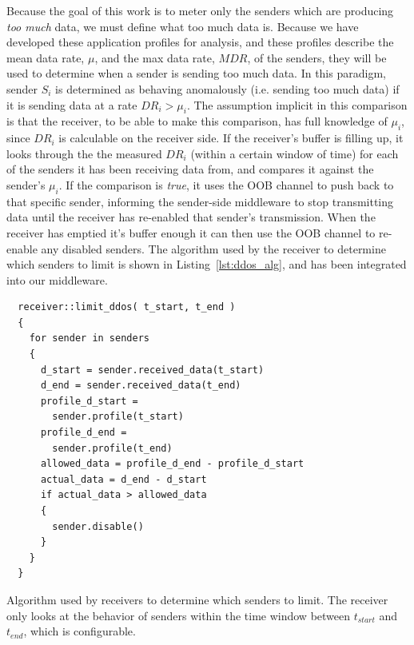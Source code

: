 Because the goal of this work is to meter only the senders which are
producing \emph{too much} data, we must define what too much data is.
Because we have developed these application profiles for analysis, and
these profiles describe the mean data rate, $\mu$, and the max data
rate, $MDR$, of the senders, they will be used to determine when a
sender is sending too much data.  In this paradigm, sender $S_i$ is
determined as behaving anomalously (i.e. sending too much data) if it
is sending data at a rate $DR_i > \mu_i$.  The assumption implicit in
this comparison is that the receiver, to be able to make this
comparison, has full knowledge of $\mu_i$, since $DR_i$ is calculable
on the receiver side.  If the receiver's buffer is filling up, it
looks through the the measured $DR_i$ (within a certain window of
time) for each of the senders it has been receiving data from, and
compares it against the sender's $\mu_i$.  If the comparison is
\emph{true}, it uses the OOB channel to push back to that specific
sender, informing the sender-side middleware to stop transmitting data
until the receiver has re-enabled that sender's transmission.  When
the receiver has emptied it's buffer enough it can then use the OOB
channel to re-enable any disabled senders.  The algorithm used by the
receiver to determine which senders to limit is shown in
Listing~\ref{lst:ddos_alg}, and has been integrated into our middleware.

\begin{listing}[ht!]
  \begin{verbatim}
  receiver::limit_ddos( t_start, t_end )
  {
    for sender in senders
    {
      d_start = sender.received_data(t_start)
      d_end = sender.received_data(t_end)
      profile_d_start =
        sender.profile(t_start)
      profile_d_end =
        sender.profile(t_end)
      allowed_data = profile_d_end - profile_d_start
      actual_data = d_end - d_start
      if actual_data > allowed_data
      {
        sender.disable()
      }
    }
  }
  \end{verbatim}
  \caption{Algorithm used by receivers to determine which senders to
    limit.  The receiver only looks at the behavior of senders within
    the time window between $t_{start}$ and $t_{end}$, which is
    configurable.}
  \label{lst:ddos_alg}
\end{listing}


